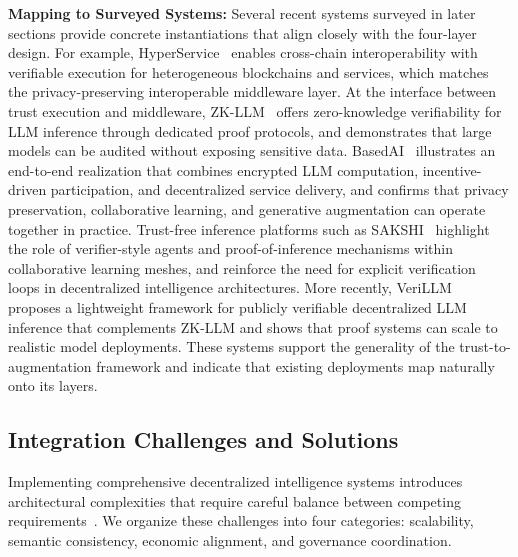 \documentclass[5p,twocolumn]{elsarticle}
\begin{document}
\textbf{Mapping to Surveyed Systems:} Several recent systems surveyed in later sections provide concrete instantiations that align closely with the four-layer design. For example, HyperService~\cite{liu2019hyperservice} enables cross-chain interoperability with verifiable execution for heterogeneous blockchains and services, which matches the privacy-preserving interoperable middleware layer. At the interface between trust execution and middleware, ZK-LLM~\cite{sun2024zkllm} offers zero-knowledge verifiability for LLM inference through dedicated proof protocols, and demonstrates that large models can be audited without exposing sensitive data. BasedAI~\cite{wellington2024basedai} illustrates an end-to-end realization that combines encrypted LLM computation, incentive-driven participation, and decentralized service delivery, and confirms that privacy preservation, collaborative learning, and generative augmentation can operate together in practice. Trust-free inference platforms such as SAKSHI~\cite{bhat2023sakshi} highlight the role of verifier-style agents and proof-of-inference mechanisms within collaborative learning meshes, and reinforce the need for explicit verification loops in decentralized intelligence architectures. More recently, VeriLLM~\cite{wang2025verillm} proposes a lightweight framework for publicly verifiable decentralized LLM inference that complements ZK-LLM and shows that proof systems can scale to realistic model deployments. These systems support the generality of the trust-to-augmentation framework and indicate that existing deployments map naturally onto its layers.

\subsection{Integration Challenges and Solutions}
Implementing comprehensive decentralized intelligence systems introduces architectural complexities that require careful balance between competing requirements~\cite{hassan2025enabling}. We organize these challenges into four categories: scalability, semantic consistency, economic alignment, and governance coordination.
\end{document}
